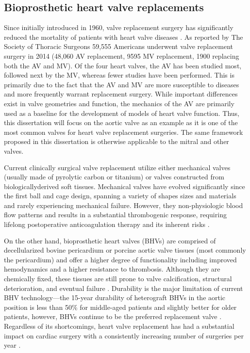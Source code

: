 \subsection{Bioprosthetic heart valve replacements}
     
    Since initially introduced in 1960, valve replacement surgery has significantly reduced the mortality of patients with heart valve diseases \cite{braunwald_complete_1960,pibarot_valvular_2009,ross_replacement_1967}. As reported by The Society of Thoracic Surgeons 59,555 Americans underwent valve replacement surgery in 2014 (48,060 AV replacement, 9595 MV replacement, 1900 replacing both the AV and MV).  Of the four heart valves, the AV has been studied most, followed next by the MV, whereas fewer studies have been performed. This is primarily due to the fact that the AV \cite{christie_age_1995,merryman_correlation_2006,adamczyk_characteristics_2002,sacks_aortic_1998,billiar_biaxial_2000,billiar_biaxial_2000b,vesely_comparison_1998,vesely_micromechanics_1992,vesely_role_1998} and MV \cite{stella_biaxial_2007,sacks_surface_2002,gorman_dynamic_1996,gorman_effect_2004} are more susceptible to diseases and more frequently warrant replacement surgery. While important differences exist in valve geometries and function, the mechanics of the AV are primarily used as a baseline for the development of models of heart valve function. Thus, this dissertation will focus on the aortic valve as an example as it is one of the most common valves for heart valve replacement surgeries. The same framework proposed in this dissertation is otherwise applicable to the mitral and other valves. 
    
    
    Current clinically surgical valve replacement utilize either mechanical valves (usually made of pyrolytic carbon or titanium) or valves constructed from biologically\Hyphdash derived soft tissues.  Mechanical valves have evolved significantly since the first ball and cage design, spanning a variety of shapes sizes and materials and rarely experiencing mechanical failure. However, they non-physiologic blood flow patterns and results in a substantial thrombogenic response, requiring lifelong postoperative anticoagulation therapy and its inherent risks \cite{pibarot_valvular_2009}.
    
    
    On the other hand, bioprosthetic heart valves (BHVs) are comprised of decellularized bovine pericardium or porcine aortic valve tissues (most commonly the pericardium) and offer a higher degree of functionality including improved hemodynamics and a higher resistance to thrombosis. Although they are chemically fixed, these tissues are still prone to valve calcification, structural deterioration, and eventual failure \cite{sacks_collagen_2002,vyavahare_mechanisms_1999}. Durability is the major limitation of current BHV technology—the 15-year durability of heterograft BHVs in the aortic position is less than 50\% for middle-aged patients and slightly better for older patients, however, BHVs continue to be the preferred replacement valve \cite{siddiqui_bioprosthetic_2009}. Regardless of its shortcomings, heart valve replacement has had a substantial impact on cardiac surgery with a consistently increasing number of surgeries per year \cite{starr_artificial_2007}.

